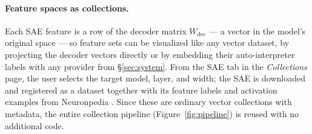 \documentclass[11pt]{article}
\begin{document}







\paragraph{Feature spaces as collections.}

Each SAE feature is a row of the decoder matrix $W_{\mathrm{dec}}$ — a vector in the model's original space — so feature sets can be visualized like any vector dataset, by projecting the decoder vectors directly or by embedding their auto-interpreter labels \cite{bills2023language, paulo2025automaticallyinterpretingmillionsfeatures} with any provider from \S\ref{sec:system}. From the SAE tab in the \textit{Collections} page, the user selects the target model, layer, and width; the SAE is downloaded and registered as a dataset together with its feature labels and activation examples from Neuronpedia \cite{neuronpedia}. Since these are ordinary vector collections with metadata, the entire collection pipeline (Figure~\ref{fig:pipeline}) is reused with no additional code.
 
\end{document}
